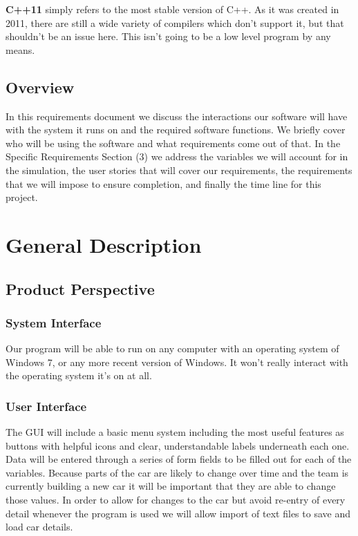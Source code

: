\documentclass[onecolumn, draftclsnofoot,10pt, compsoc]{IEEEtran}
\begin{document}
    \vspace{.1cm}
    \noindent \textbf{C++11} simply refers to the most stable version of C++.
    As it was created in 2011, there are still a wide variety of compilers which don't support it, but that shouldn't be an issue here.
    This isn't going to be a low level program by any means.
    
    \subsection{Overview}
    In this requirements document we discuss the interactions our software will have with the system it runs on and the required software functions. We briefly cover who will be using the software and what requirements come out of that. In the Specific Requirements Section (3) we address the variables we will account for in the simulation, the user stories that will cover our requirements, the requirements that we will impose to ensure completion, and finally the time line for this project.

\section{General Description}
    
    \subsection{Product Perspective}
    
        \subsubsection{System Interface}    %
        Our program will be able to run on any computer with an operating system of Windows 7, or any more recent version of Windows.
        It won't really interact with the operating system it's on at all.
        
        \subsubsection{User Interface}      %
        The GUI will include a basic menu system including the most useful features as buttons with helpful icons and clear, understandable labels underneath each one. 
        Data will be entered through a series of form fields to be filled out for each of the variables. 
        Because parts of the car are likely to change over time and the team is currently building a new car it will be important that they are able to change those values. 
        In order to allow for changes to the car but avoid re-entry of every detail whenever the program is used we will allow import of text files to save and load car details.
        
\end{document}
